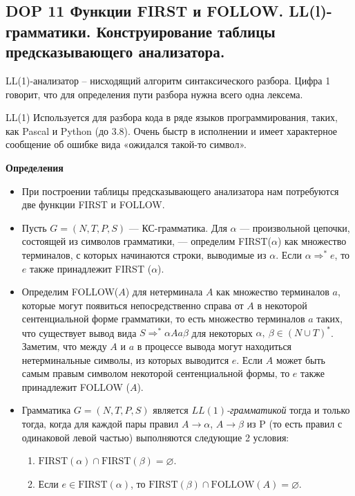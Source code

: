 \subsection{DOP 11 Функции FIRST и FOLLOW. LL(l)-грамматики. Конструирование таблицы предсказывающего анализатора.}

LL(1)-анализатор -- нисходящий алгоритм синтаксического разбора. Цифра 1 говорит, что для определения пути разбора нужна всего одна лексема.

LL(1) Используется для разбора кода в ряде языков программирования, таких, как Pascal и Python (до 3.8). Очень быстр в исполнении и имеет характерное сообщение об ошибке вида «ожидался такой-то символ».

\textbf{Определения}
\begin{itemize}
    \item При построении таблицы предсказывающего анализатора нам потребуются две функции FIRST и FOLLOW.
    \item Пусть $G = (N, T, P, S)$ --- КС-грамматика. 
    Для $\alpha$ --- произвольной цепочки, состоящей из символов грамматики, --- определим FIRST($\alpha$) как множество терминалов, с которых начинаются строки, выводимые из $\alpha$. 
    Если $\alpha \Rightarrow^\ast e$, то $e$ также принадлежит FIRST ($\alpha$).
    \item Определим FOLLOW($A$) для нетерминала $A$ как множество терминалов $a$, которые могут появиться непосредственно справа от $A$ в некоторой сентенциальной форме грамматики, то есть множество терминалов $a$ таких, что существует вывод вида $S \Rightarrow^\ast \alpha A a \beta$ для некоторых $\alpha,~\beta \in (N \cup T)^\ast$.
    Заметим, что между $A$ и $a$ в процессе вывода могут находиться нетерминальные символы, из которых выводится $e$. 
    Если $A$ может быть самым правым символом некоторой сентенциальной формы, то $e$ также принадлежит FOLLOW ($A$).
    \item Грамматика $G = (N, T, P, S)$ является \textit{$LL(1)$-грамматикой} тогда и только тогда, когда для каждой пары правил $A \rightarrow \alpha$, $A \rightarrow \beta$ из P (то есть правил с одинаковой левой частью) выполняются следующие 2 условия:
    \begin{enumerate}
        \item $\text{FIRST}(\alpha) \cap \text{FIRST}(\beta) = \varnothing$.
        \item Если $e \in \text{FIRST}(\alpha)$, то $\text{FIRST}(\beta) \cap \text{FOLLOW}(A) = \varnothing$.
    \end{enumerate}
\end{itemize}

